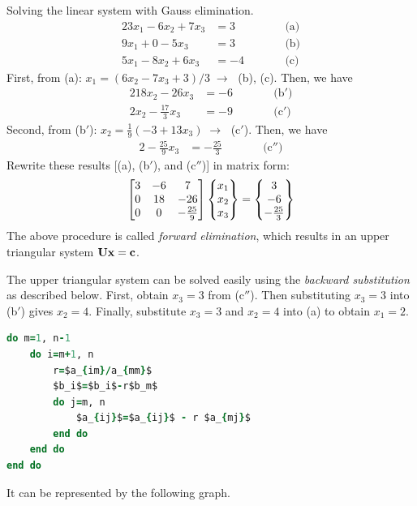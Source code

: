 \begin{example}
Solving the linear system with Gauss elimination.
\begin{alignat*}{2}
  3x_1 - 6x_2 + 7x_3 &= 3 &\qquad&\text{(a)}\\
  9x_1 + 0 - 5x_3 &= 3 &&\text{(b)}\\
  5x_1 - 8x_2 + 6x_3 &= -4 &&\text{(c)}
\end{alignat*}
First, from (a): $x_1 = (6x_2-7x_3+3)/3 \;\rightarrow\;$ (b), (c). Then, we have
\begin{alignat*}{2}
  18x_2 - 26x_3 &= -6 &\qquad&\text{(b$'$)}\\
  2x_2 - \tfrac{17}{3}x_3 &= -9 &&\text{(c$'$)}
\end{alignat*}
Second, from (b$'$): $x_2 = \frac19(-3+13x_3) \;\rightarrow\;$ (c$'$). Then, we have
\begin{alignat*}{2}
  -\tfrac{25}{9}x_3 &= -\tfrac{25}{3} &\qquad&\text{(c$''$)}
\end{alignat*}
Rewrite these results [(a), (b$'$), and (c$''$)] in matrix form:
\begin{equation*}
  \begin{bmatrix}3 & -6 & 7\\ 0 & 18 & -26\\ 0 & 0 & -\frac{25}{9}\end{bmatrix}\begin{Bmatrix}x_1\\ x_2\\ x_3\end{Bmatrix} = \begin{Bmatrix}3\\ -6\\ -\frac{25}{3}\end{Bmatrix}
\end{equation*}
The above procedure is called \emph{forward elimination}, which results in an upper triangular system $\mathbf{U}\mathbf{x} = \mathbf{c}$.

The upper triangular system can be solved easily using the \emph{backward substitution} as described below. First, obtain $x_3 = 3$ from (c$''$). Then substituting $x_3 = 3$ into (b$'$) gives $x_2 = 4$. Finally, substitute $x_3 = 3$ and $x_2 = 4$ into (a) to obtain $x_1 = 2$.
\end{example}

\begin{lstlisting}[language=Fortran,numbers=none,basicstyle=\small\ttfamily\itshape,mathescape=true]
do m=1, n-1
    do i=m+1, n
        r=$a_{im}/a_{mm}$
        $b_i$=$b_i$-r$b_m$
        do j=m, n
            $a_{ij}$=$a_{ij}$ - r $a_{mj}$
        end do
    end do
end do
\end{lstlisting}
It can be represented by the following graph.
\begin{fig}
  
\end{fig}

